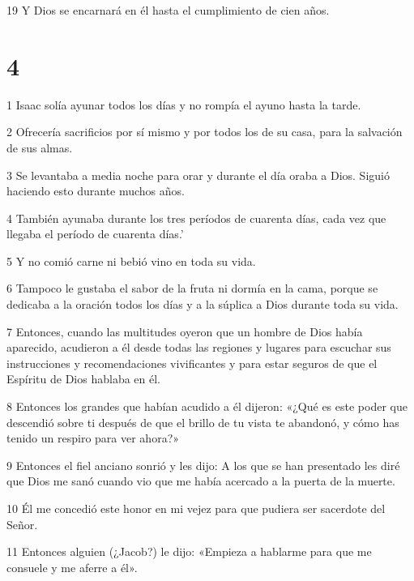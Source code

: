 \par 19 Y Dios se encarnará en él hasta el cumplimiento de cien años.

\chapter{4}

\par 1 Isaac solía ayunar todos los días y no rompía el ayuno hasta la tarde.

\par 2 Ofrecería sacrificios por sí mismo y por todos los de su casa, para la salvación de sus almas.

\par 3 Se levantaba a media noche para orar y durante el día oraba a Dios. Siguió haciendo esto durante muchos años.

\par 4 También ayunaba durante los tres períodos de cuarenta días, cada vez que llegaba el período de cuarenta días.'

\par 5 Y no comió carne ni bebió vino en toda su vida.

\par 6 Tampoco le gustaba el sabor de la fruta ni dormía en la cama, porque se dedicaba a la oración todos los días y a la súplica a Dios durante toda su vida.

\par 7 Entonces, cuando las multitudes oyeron que un hombre de Dios había aparecido, acudieron a él desde todas las regiones y lugares para escuchar sus instrucciones y recomendaciones vivificantes y para estar seguros de que el Espíritu de Dios hablaba en él.

\par 8 Entonces los grandes que habían acudido a él dijeron: «¿Qué es este poder que descendió sobre ti después de que el brillo de tu vista te abandonó, y cómo has tenido un respiro para ver ahora?»

\par 9 Entonces el fiel anciano sonrió y les dijo: A los que se han presentado les diré que Dios me sanó cuando vio que me había acercado a la puerta de la muerte.

\par 10 Él me concedió este honor en mi vejez para que pudiera ser sacerdote del Señor.

\par 11 Entonces alguien (¿Jacob?) le dijo: «Empieza a hablarme para que me consuele y me aferre a él».

